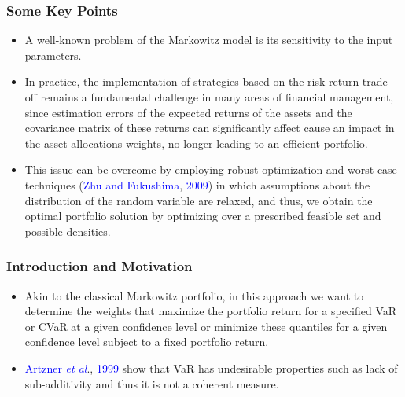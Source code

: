 \documentclass[pdf,10pt,xcolor=dvipsnames,hide notes]{beamer}
\begin{document}
\begin{frame}[label=frame1d]
	\frametitle{Some Key Points}
	
	\begin{itemize}
		\justifying
		
		
		\vspace{0.3cm}
		
		\item A well-known problem of
		the Markowitz model is its sensitivity to the input parameters. 
		
		\vspace{0.3cm}
		
		\item In practice, the implementation of strategies based on the risk-return trade-off remains a fundamental challenge in many areas of financial management, since estimation errors of the expected returns of the assets and the covariance
		matrix of these returns can significantly affect cause an impact in the asset allocations weights, no
		longer leading to an efficient portfolio.
		
	
		\vspace{0.3cm}
		
	\item This issue can be overcome by employing robust optimization and
	worst case techniques (\textcolor{blue}{Zhu and Fukushima}, \textcolor{blue}{2009}) in which assumptions about the
	distribution of the random variable are relaxed, and thus, we obtain the
	optimal portfolio solution by optimizing over a prescribed feasible set and
	possible densities.
		
	\end{itemize}
	
\end{frame}

\begin{frame}[label=frame1d]
	\frametitle{Introduction and Motivation}
	
	\begin{itemize}
		\justifying
		
		\item Akin to
				the classical Markowitz portfolio, in this approach we want to determine
				the weights that maximize the portfolio return for a specified VaR or CVaR
				at a given confidence level or minimize these quantiles for a given
				confidence level subject to a fixed portfolio return.
				
				\vspace{0.3cm}
				
				\item  \textcolor{blue}{Artzner \emph{et al}}., \textcolor{blue}{1999} show that VaR has undesirable properties such as lack
				of sub-additivity and thus it is not a coherent measure.
		
			\end{itemize}
	
\end{frame}
\end{document}
